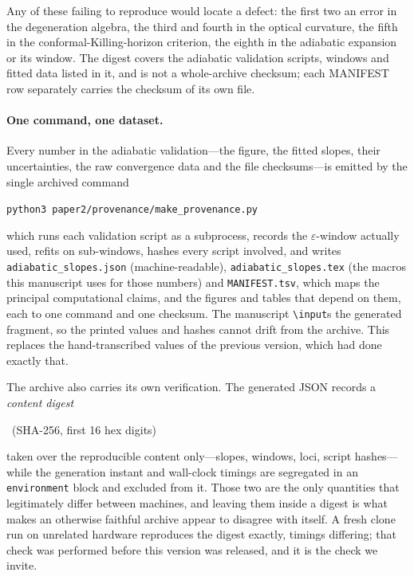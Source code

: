 \documentclass[12pt]{iopart}
\theoremstyle{plain}
\theoremstyle{definition}
\theoremstyle{remark}
\begin{document}
Any of these failing to reproduce would locate a defect: the first two an error in
the degeneration algebra, the third and fourth in the optical curvature, the fifth
in the conformal-Killing-horizon criterion, the eighth in the adiabatic expansion or
its window. The digest covers the adiabatic validation scripts, windows and
fitted data listed in it, and is not a whole-archive checksum; each MANIFEST row
separately carries the checksum of its own file.

\paragraph{One command, one dataset.} Every number in the adiabatic validation---the
figure, the fitted slopes, their uncertainties, the raw convergence data and the file
checksums---is emitted by the single archived command
\begin{center}
\texttt{python3 paper2/provenance/make\_provenance.py}
\end{center}
which runs each validation script as a subprocess, records the $\varepsilon$-window
actually used, refits on sub-windows, hashes every script involved, and writes
\texttt{adiabatic\_slopes.json} (machine-readable), \texttt{adiabatic\_slopes.tex} (the
macros this manuscript uses for those numbers) and \texttt{MANIFEST.tsv}, which maps the
principal computational claims, and the figures and tables that depend on them,
each to one command and one checksum. The manuscript
\texttt{\textbackslash input}s the generated fragment, so the printed values and hashes
cannot drift from the archive. This replaces the hand-transcribed values of the previous
version, which had done exactly that.

The archive also carries its own verification. The generated JSON records a
\emph{content digest}
\begin{center}
    \ProvenanceDigest\ (SHA-256, first 16 hex digits)
\end{center}
taken over the reproducible content only---slopes, windows, loci, script
hashes---while the generation instant and wall-clock timings are segregated in an
\texttt{environment} block and excluded from it. Those two are the only quantities
that legitimately differ between machines, and leaving them inside a digest is what
makes an otherwise faithful archive appear to disagree with itself. A fresh clone
run on unrelated hardware reproduces the digest exactly, timings differing; that
check was performed before this version was released, and it is the check we
invite.
\end{document}
